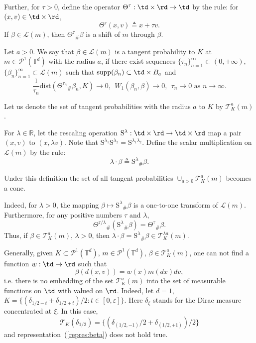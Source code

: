\documentclass[12pt]{article}
\newcommand{\ptd}{\mathcal{P}^1(\mathbb{T}^d)}
\begin{document}
Further, for $\tau>0$, define the operator $\Theta^\tau:\td\times\rd\rightarrow \td$ by the rule: for $(x,v)\in\td\times\rd$, 
\begin{equation}\label{def:Theta}
\Theta^\tau(x,v)\triangleq x+\tau v. 
\end{equation}
If $\beta\in\mathcal{L}(m)$, then $\Theta^\tau{}_\#\beta$ is a shift of $m$ through $\beta$.

\begin{definition}\label{def:tangent} Let $a>0$.
	We say that $\beta\in\mathcal{L}(m)$ is a tangent probability to $K$ at $m\in\ptd$ with the radius $a$, if there exist  sequences $\{\tau_n\}_{n=1}^\infty\subset (0,+\infty)$, $\{\beta_n\}_{n=1}^\infty\subset \mathcal{L}(m)$ such that $\mathrm{supp}(\beta_n)\subset \td\times B_a$ and
	$$\frac{1}{\tau_n}\mathrm{dist}(\Theta^{\tau_n}{}_\#\beta_n,K)\rightarrow 0,\ \ W_1(\beta_n,\beta)\rightarrow 0,\ \  \tau_n\rightarrow 0\mbox{ as }n\rightarrow\infty.$$ 
	
	Let us denote the set of tangent probabilities with the radius $a$ to $K$  by $\mathcal{T}^a_K(m)$.
\end{definition}
\begin{remark} For $\lambda\in\mathbb{R}$, let  the  rescaling operation $\mathrm{S}^\lambda:\td\times\rd\rightarrow\td\times\rd$ map a pair $(x,v)$ to
	$(x,\lambda v). $ Note that $\mathrm{S}^{\lambda_1}\mathrm{S}^{\lambda_2}=\mathrm{S}^{\lambda_1\lambda_2}$. 
	Define the scalar multiplication on $\mathcal{L}(m)$ by the rule: $$\lambda\cdot\beta\triangleq\mathrm{S}^\lambda{}_\#\beta.$$
	
	Under this definition the set of all tangent probabilities $\cup_{a>0}\mathcal{T}_K^a(m)$ becomes a cone.
	
	Indeed, for $\lambda> 0$, the mapping $\beta\mapsto \mathrm{S}^\lambda{}_\#\beta$ is a one-to-one transform of $\mathcal{L}(m)$. Furthermore, for any positive numbers $\tau$ and $\lambda$,
	$$\Theta^{\tau/\lambda}{}_\#(\mathrm{S}^\lambda{}_\#\beta)=\Theta^\tau{}_\#\beta. $$
	Thus, if $\beta\in\mathcal{T}_K^a(m)$, $\lambda>0$, then  $\lambda\cdot\beta=\mathrm{S}^\lambda{}_\#\beta\in \mathcal{T}_K^{\lambda a}(m)$.
\end{remark}

\begin{remark}
	Generally,  given $K\subset\ptd$, $m\in\ptd$, $\beta\in\mathcal{T}_K^a(m)$, one can not  find a function $w:\td\rightarrow\rd$ such that
	\begin{equation}\label{repres:beta}
	\beta(d(x,v))=w(x)m(dx)dv,
	\end{equation}  i.e. there is no embedding of the set $\mathcal{T}_K^a(m)$ into the set of measurable functions on $\td$ with valued on $\rd$.
	Indeed, let $d=1$,  $K=\{(\delta_{1/2-t}+\delta_{1/2+t})/2:t\in [0,\varepsilon]\}$. Here $\delta_\xi$ stands for the Dirac measure concentrated at $\xi$. In this case,
	$$\mathcal{T}_{K}(\delta_{1/2})=\{(\delta_{(1/2,-1)}/2+\delta_{(1/2,+1)})/2\}$$ and representation~(\ref{repres:beta}) does not hold true.  
\end{remark}
\end{document}
